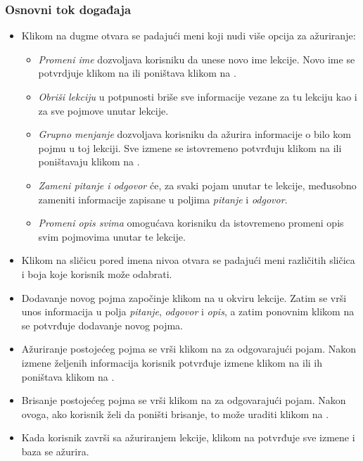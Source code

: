\subsubsection{Osnovni tok događaja}
\begin{itemize}
  \item Klikom na dugme \SettingsButton{} otvara se padajući meni koji nudi više opcija za ažuriranje:
  \begin{itemize}
    \item \emph{Promeni ime} dozvoljava korisniku da unese novo ime lekcije.
    Novo ime se potvrdjuje klikom na \CheckButton{} ili poništava klikom na \CrossButton{}.
    \item \emph{Obriši lekciju} u potpunosti briše sve informacije vezane za tu lekciju kao i za sve pojmove unutar lekcije.
    \item \emph{Grupno menjanje} dozvoljava korisniku da ažurira informacije o bilo kom pojmu u toj lekciji.
    Sve izmene se istovremeno potvrđuju klikom na \CheckButton{} ili poništavaju klikom na \CrossButton{}.
    \item \emph{Zameni pitanje i odgovor} će, za svaki pojam unutar te lekcije, međusobno zameniti informacije zapisane u poljima \emph{pitanje} i \emph{odgovor}.
    \item \emph{Promeni opis svima} omogućava korisniku da istovremeno promeni opis svim pojmovima unutar te lekcije. %
  \end{itemize}
  \item Klikom na sličicu pored imena nivoa otvara se padajući meni različitih sličica i boja koje korisnik može odabrati.
  \item Dodavanje novog pojma započinje klikom na \PlusButton{} u okviru lekcije.
  Zatim se vrši unos informacija u polja \emph{pitanje}, \emph{odgovor} i \emph{opis}, a zatim ponovnim klikom na \PlusButton{} se potvrđuje dodavanje novog pojma.
  \item Ažuriranje postojećeg pojma se vrši klikom na \EditCourseButton za odgovarajući pojam.
  Nakon izmene željenih informacija korisnik potvrđuje izmene klikom na \CheckButton{} ili ih poništava klikom na \CrossButton{}.
  \item Brisanje postojećeg pojma se vrši klikom na \DeleteButton{} za odgovarajući pojam.
  Nakon ovoga, ako korisnik želi da poništi brisanje, to može uraditi klikom na \UndoButton{}.
  \item Kada korisnik završi sa ažuriranjem lekcije, klikom na \SaveButton{} potvrđuje sve izmene i baza se ažurira.
\end{itemize}
